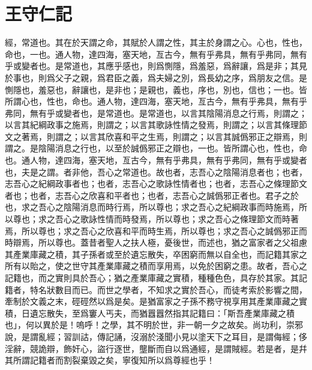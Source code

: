 \section[尊經閣記\quad{\small 王守仁}]{{\normalsize 王守仁}\quad {}記}
經，常道也。其在於天謂之命，其賦於人謂之性，其主於身謂之心。心也，性也，命也，一也。通人物，達四海，塞天地，亙古今，無有乎弗具，無有乎弗同，無有乎或變者也。是常道也，其應乎感也，則爲惻隱，爲羞惡，爲辭讓，爲是非；其見於事也，則爲父子之親，爲君臣之義，爲夫婦之別，爲長幼之序，爲朋友之信。是惻隱也，羞惡也，辭讓也，是非也；是親也，義也，序也，別也，信也；{一也}。皆所謂心也，性也，命也。通人物，達四海，塞天地，亙古今，無有乎弗具，無有乎弗同，無有乎或變者也，是常道也。{是常道也}，以言其陰陽消息之行焉，則謂之；以言其紀綱政事之施焉，則謂之；以言其歌詠性情之發焉，則謂之；以言其條理節文之著焉，則謂之；以言其欣喜和平之生焉，則謂之；以言其誠僞邪正之辯焉，則謂之。是陰陽消息之行也，以至於誠僞邪正之辯也，一也。皆所謂心也，性也，命也。通人物，達四海，塞天地，亙古今，無有乎弗具，無有乎弗同，無有乎或變者也，夫是之謂。者非他，吾心之常道也。故也者，志吾心之陰陽消息者也；也者，志吾心之紀綱政事者也；也者，志吾心之歌詠性情者也；也者，志吾心之條理節文者也；也者，志吾心之欣喜和平者也；也者，志吾心之誠僞邪正者也。君子之於也，求之吾心之陰陽消息而時行焉，所以尊也；求之吾心之紀綱政事而時施焉，所以尊也；求之吾心之歌詠性情而時發焉，所以尊也；求之吾心之條理節文而時著焉，所以尊也；求之吾心之欣喜和平而時生焉，所以尊也；求之吾心之誠僞邪正而時辯焉，所以尊也。蓋昔{者}聖人之扶人極，憂後世，而述也，猶之富家者之父祖慮其產業庫藏之積，其子孫者或至於遺{忘}散失，卒困窮而無以自全也，而記籍其家之所有以貽之，使之世守其產業庫藏之積而享用焉，以免於困窮之患。故者，吾心之記籍也，而之實則具於吾心；猶之產業庫藏之實積，種種色色，具存於其家。其記籍者，特名狀數目而已。而世之學者，不知求之實於吾心，而徒考索於影響之間，牽制於文義之末，硜硜然以爲是矣。是猶富家之子孫不務守視享用其產業庫藏之實積，日遺{忘}散失，至爲窶人丐夫，而猶囂囂然指其記籍曰：「斯吾產業庫藏之積也」，何以異於是！嗚呼！之學，其不明於世，非一朝一夕之故矣。尚功利，崇邪說，是謂亂經；習訓詁，傳記誦，沒溺於淺聞小見以塗天下之耳目，是謂侮經；侈淫辭，競詭辯，飾奸心，盜行逐世，壟斷而自以爲通經，是謂賊經。若是者，是幷其所謂記籍者而割裂棄毀之矣，寧復知所以爲尊經也乎！%

